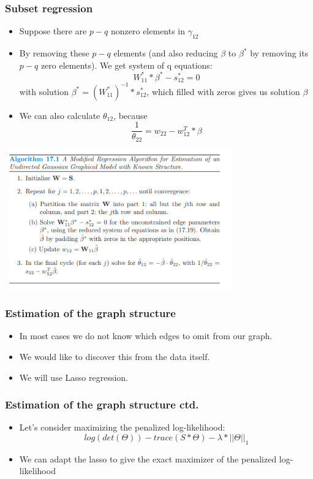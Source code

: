 \documentclass{beamer}
\begin{document}
\begin{frame}
\frametitle{Subset regression}
\begin{itemize}
\item Suppose there are $p−q$ nonzero elements in $\gamma_{12}$
\item By removing these $p-q$ elements (and also reducing $\beta$ to $\beta^*$ by removing its $p − q$ zero elements). We get system of q equations:
\begin{equation}
W_{11}^* * \beta^* - s_{12}^* = 0
\end{equation}
with solution $\beta^* = (W_{11}^*)^{-1} * s_{12}^*$, which filled with zeros gives us solution $\beta$
\item We can also calculate $\theta_{12}$, because 
\begin{equation}
\frac{1}{\theta_{22}} = w_{22} - w_{12}^T * \beta
\end{equation}
\end{itemize}
\end{frame}
\begin{frame}
\includegraphics[width=10cm, height=6cm]{Algorithm linear regression}
\end{frame}

\begin{frame}
\frametitle{Estimation of the graph structure}
\begin{itemize}
\item In most cases we do not know which edges to omit from our graph.
\item We would like to discover this from the data itself.
\item We will use Lasso regression.
\end{itemize}
\end{frame}

\begin{frame}
\frametitle{Estimation of the graph structure ctd.}
\begin{itemize}
\item Let's consider maximizing the penalized
log-likelihood:
\begin{equation}
log(det(\Theta))-trace(S*\Theta)-\lambda*||\Theta||_1
\end{equation}
\item We can adapt the lasso to give the exact maximizer of the penalized log-likelihood
\end{itemize}
\end{frame}
\end{document}
